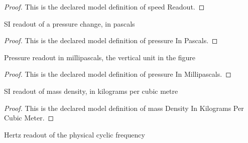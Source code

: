 \begin{proof}
  This is the declared model definition of speed Readout.
\end{proof}
\begin{definition}
  \label{def:physics:phyx-mini-0309:phyxminiproblems-problemphyxmini0309-pressureinpascals}
  SI readout of a pressure change, in pascals
\end{definition}
\begin{proof}
  This is the declared model definition of pressure In Pascals.
\end{proof}
\begin{definition}
  \label{def:physics:phyx-mini-0309:phyxminiproblems-problemphyxmini0309-pressureinmillipascals}
  Pressure readout in millipascals, the vertical unit in the figure
\end{definition}
\begin{proof}
  This is the declared model definition of pressure In Millipascals.
\end{proof}
\begin{definition}
  \label{def:physics:phyx-mini-0309:phyxminiproblems-problemphyxmini0309-massdensityinkilogramspercubicmeter}
  SI readout of mass density, in kilograms per cubic metre
\end{definition}
\begin{proof}
  This is the declared model definition of mass Density In Kilograms Per Cubic Meter.
\end{proof}
\begin{definition}
  \label{def:physics:phyx-mini-0309:phyxminiproblems-problemphyxmini0309-frequencyinhertz}
  Hertz readout of the physical cyclic frequency
\end{definition}
